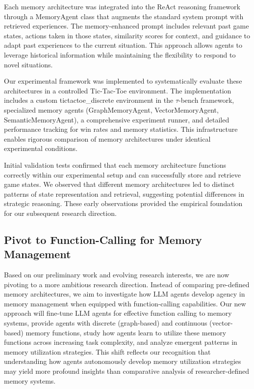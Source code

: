 \documentclass{article}
\begin{document}
Each memory architecture was integrated into the ReAct reasoning framework through a MemoryAgent class that augments the standard system prompt with retrieved experiences. The memory-enhanced prompt includes relevant past game states, actions taken in those states, similarity scores for context, and guidance to adapt past experiences to the current situation. This approach allows agents to leverage historical information while maintaining the flexibility to respond to novel situations.

Our experimental framework was implemented to systematically evaluate these architectures in a controlled Tic-Tac-Toe environment. The implementation includes a custom tictactoe\_discrete environment in the $\tau$-bench framework, specialized memory agents (GraphMemoryAgent, VectorMemoryAgent, SemanticMemoryAgent), a comprehensive experiment runner, and detailed performance tracking for win rates and memory statistics. This infrastructure enables rigorous comparison of memory architectures under identical experimental conditions.

Initial validation tests confirmed that each memory architecture functions correctly within our experimental setup and can successfully store and retrieve game states. We observed that different memory architectures led to distinct patterns of state representation and retrieval, suggesting potential differences in strategic reasoning. These early observations provided the empirical foundation for our subsequent research direction.

\subsection{Pivot to Function-Calling for Memory Management}

Based on our preliminary work and evolving research interests, we are now pivoting to a more ambitious research direction. Instead of comparing pre-defined memory architectures, we aim to investigate how LLM agents develop agency in memory management when equipped with function-calling capabilities. Our new approach will fine-tune LLM agents for effective function calling to memory systems, provide agents with discrete (graph-based) and continuous (vector-based) memory functions, study how agents learn to utilize these memory functions across increasing task complexity, and analyze emergent patterns in memory utilization strategies. This shift reflects our recognition that understanding how agents autonomously develop memory utilization strategies may yield more profound insights than comparative analysis of researcher-defined memory systems.
\end{document}
